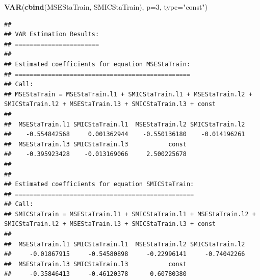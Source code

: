 \documentclass[11pt,]{article}
\newenvironment{Shaded}{\begin{snugshade}}{\end{snugshade}}
\newcommand{\KeywordTok}[1]{\textcolor[rgb]{0.13,0.29,0.53}{\textbf{{#1}}}}
\newcommand{\DataTypeTok}[1]{\textcolor[rgb]{0.13,0.29,0.53}{{#1}}}
\newcommand{\DecValTok}[1]{\textcolor[rgb]{0.00,0.00,0.81}{{#1}}}
\newcommand{\FloatTok}[1]{\textcolor[rgb]{0.00,0.00,0.81}{{#1}}}
\newcommand{\StringTok}[1]{\textcolor[rgb]{0.31,0.60,0.02}{{#1}}}
\newcommand{\CommentTok}[1]{\textcolor[rgb]{0.56,0.35,0.01}{\textit{{#1}}}}
\newcommand{\NormalTok}[1]{{#1}}
\begin{document}
\begin{Shaded}
\begin{Highlighting}[]
\KeywordTok{VAR}\NormalTok{(}\KeywordTok{cbind}\NormalTok{(MSEStaTrain, SMICStaTrain), }\DataTypeTok{p=}\DecValTok{3}\NormalTok{, }\DataTypeTok{type=}\StringTok{"const"}\NormalTok{)}
\end{Highlighting}
\end{Shaded}

\begin{verbatim}
## 
## VAR Estimation Results:
## ======================= 
## 
## Estimated coefficients for equation MSEStaTrain: 
## ================================================ 
## Call:
## MSEStaTrain = MSEStaTrain.l1 + SMICStaTrain.l1 + MSEStaTrain.l2 + SMICStaTrain.l2 + MSEStaTrain.l3 + SMICStaTrain.l3 + const 
## 
##  MSEStaTrain.l1 SMICStaTrain.l1  MSEStaTrain.l2 SMICStaTrain.l2 
##    -0.554842568     0.001362944    -0.550136180    -0.014196261 
##  MSEStaTrain.l3 SMICStaTrain.l3           const 
##    -0.395923428    -0.013169066     2.500225678 
## 
## 
## Estimated coefficients for equation SMICStaTrain: 
## ================================================= 
## Call:
## SMICStaTrain = MSEStaTrain.l1 + SMICStaTrain.l1 + MSEStaTrain.l2 + SMICStaTrain.l2 + MSEStaTrain.l3 + SMICStaTrain.l3 + const 
## 
##  MSEStaTrain.l1 SMICStaTrain.l1  MSEStaTrain.l2 SMICStaTrain.l2 
##     -0.01867915     -0.54580898     -0.22996141     -0.74042266 
##  MSEStaTrain.l3 SMICStaTrain.l3           const 
##     -0.35846413     -0.46120378      0.60780380
\end{verbatim}

\begin{Shaded}
\end{Shaded}
\end{document}
